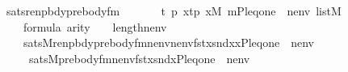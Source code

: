 \begin{isabellebody}
\ sats{\isacharunderscore}{\kern0pt}renpbdy{\isacharunderscore}{\kern0pt}prebody{\isacharunderscore}{\kern0pt}fm{\isacharcolon}{\kern0pt}\isanewline
\ \ \isanewline
\ \ \ \ {\isachardoublequoteopen}{\isasymexists}t\ p{\isachardot}{\kern0pt}\ x{\isacharequal}{\kern0pt}{\isasymlangle}t{\isacharcomma}{\kern0pt}p{\isasymrangle}{\isachardoublequoteclose}\ {\isachardoublequoteopen}x{\isasymin}M{\isachardoublequoteclose}\ {\isachardoublequoteopen}{\isacharbrackleft}{\kern0pt}{\isasymalpha}{\isacharcomma}{\kern0pt}m{\isacharcomma}{\kern0pt}P{\isacharcomma}{\kern0pt}leq{\isacharcomma}{\kern0pt}one{\isacharbrackright}{\kern0pt}\ {\isacharat}{\kern0pt}\ nenv\ {\isasymin}list{\isacharparenleft}{\kern0pt}M{\isacharparenright}{\kern0pt}{\isachardoublequoteclose}\isanewline
\ \ \ \ {\isachardoublequoteopen}{\isasymphi}{\isasymin}formula{\isachardoublequoteclose}\ {\isachardoublequoteopen}arity{\isacharparenleft}{\kern0pt}{\isasymphi}{\isacharparenright}{\kern0pt}\ {\isasymle}\ {}\ {\isacharhash}{\kern0pt}{\isacharplus}{\kern0pt}\ length{\isacharparenleft}{\kern0pt}nenv{\isacharparenright}{\kern0pt}{\isachardoublequoteclose}\isanewline
\ \ \isanewline
\ \ \ \ {\isachardoublequoteopen}sats{\isacharparenleft}{\kern0pt}M{\isacharcomma}{\kern0pt}renpbdy{\isacharparenleft}{\kern0pt}prebody{\isacharunderscore}{\kern0pt}fm{\isacharparenleft}{\kern0pt}{\isasymphi}{\isacharcomma}{\kern0pt}nenv{\isacharparenright}{\kern0pt}{\isacharcomma}{\kern0pt}nenv{\isacharparenright}{\kern0pt}{\isacharcomma}{\kern0pt}{\isacharbrackleft}{\kern0pt}fst{\isacharparenleft}{\kern0pt}x{\isacharparenright}{\kern0pt}{\isacharcomma}{\kern0pt}snd{\isacharparenleft}{\kern0pt}x{\isacharparenright}{\kern0pt}{\isacharcomma}{\kern0pt}x{\isacharcomma}{\kern0pt}{\isasymalpha}{\isacharcomma}{\kern0pt}P{\isacharcomma}{\kern0pt}leq{\isacharcomma}{\kern0pt}one{\isacharbrackright}{\kern0pt}\ {\isacharat}{\kern0pt}\ nenv{\isacharparenright}{\kern0pt}\ {\isasymlongleftrightarrow}\isanewline
\ \ \ \ \ sats{\isacharparenleft}{\kern0pt}M{\isacharcomma}{\kern0pt}prebody{\isacharunderscore}{\kern0pt}fm{\isacharparenleft}{\kern0pt}{\isasymphi}{\isacharcomma}{\kern0pt}nenv{\isacharparenright}{\kern0pt}{\isacharcomma}{\kern0pt}{\isacharbrackleft}{\kern0pt}fst{\isacharparenleft}{\kern0pt}x{\isacharparenright}{\kern0pt}{\isacharcomma}{\kern0pt}snd{\isacharparenleft}{\kern0pt}x{\isacharparenright}{\kern0pt}{\isacharcomma}{\kern0pt}{\isasymalpha}{\isacharcomma}{\kern0pt}P{\isacharcomma}{\kern0pt}leq{\isacharcomma}{\kern0pt}one{\isacharbrackright}{\kern0pt}\ {\isacharat}{\kern0pt}\ nenv{\isacharparenright}{\kern0pt}{\isachardoublequoteclose}\isanewline

\end{isabellebody}

